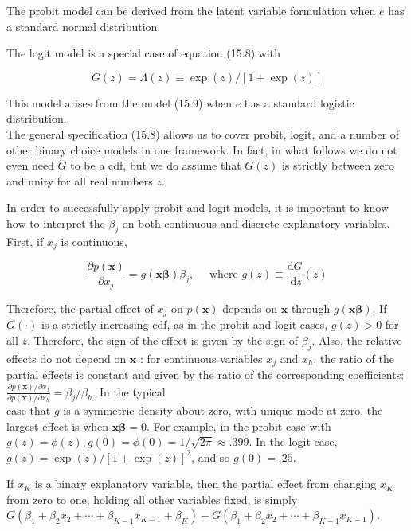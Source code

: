 \documentclass[10pt]{article}
\begin{document}
The probit model can be derived from the latent variable formulation when $e$ has a standard normal distribution.

The logit model is a special case of equation (15.8) with


\begin{equation*}
G(z)=\Lambda(z) \equiv \exp (z) /[1+\exp (z)] \tag{15.12}
\end{equation*}


This model arises from the model (15.9) when $e$ has a standard logistic distribution.\\
The general specification (15.8) allows us to cover probit, logit, and a number of other binary choice models in one framework. In fact, in what follows we do not even need $G$ to be a cdf, but we do assume that $G(z)$ is strictly between zero and unity for all real numbers $z$.

In order to successfully apply probit and logit models, it is important to know how to interpret the $\beta_{j}$ on both continuous and discrete explanatory variables. First, if $x_{j}$ is continuous,


\begin{equation*}
\frac{\partial p(\mathbf{x})}{\partial x_{j}}=g(\mathbf{x} \boldsymbol{\beta}) \beta_{j}, \quad \text { where } g(z) \equiv \frac{\mathrm{d} G}{\mathrm{~d} z}(z) \tag{15.13}
\end{equation*}


Therefore, the partial effect of $x_{j}$ on $p(\mathbf{x})$ depends on $\mathbf{x}$ through $g(\mathbf{x} \boldsymbol{\beta})$. If $G(\cdot)$ is a strictly increasing cdf, as in the probit and logit cases, $g(z)>0$ for all $z$. Therefore, the sign of the effect is given by the sign of $\beta_{j}$. Also, the relative effects do not depend on $\mathbf{x}$ : for continuous variables $x_{j}$ and $x_{h}$, the ratio of the partial effects is constant and given by the ratio of the corresponding coefficients: $\frac{\partial p(\mathbf{x}) / \partial x_{j}}{\partial p(\mathbf{x}) / \partial x_{h}}=\beta_{j} / \beta_{h}$. In the typical\\
case that $g$ is a symmetric density about zero, with unique mode at zero, the largest effect is when $\mathbf{x} \boldsymbol{\beta}=0$. For example, in the probit case with $g(z)=\phi(z), g(0)=\phi(0) =1 / \sqrt{2 \pi} \approx .399$. In the logit case, $g(z)=\exp (z) /[1+\exp (z)]^{2}$, and so $g(0)=.25$.

If $x_{K}$ is a binary explanatory variable, then the partial effect from changing $x_{K}$ from zero to one, holding all other variables fixed, is simply\\
$G\left(\beta_{1}+\beta_{2} x_{2}+\cdots+\beta_{K-1} x_{K-1}+\beta_{K}\right)-G\left(\beta_{1}+\beta_{2} x_{2}+\cdots+\beta_{K-1} x_{K-1}\right)$.
\end{document}
